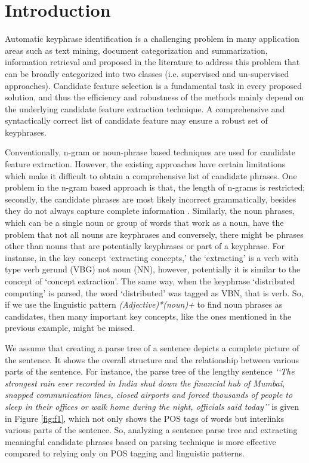\documentclass{ieeeaccess}
\begin{document}
\section{Introduction}
\label{sec:introduction}
Automatic keyphrase identification is a challenging problem in many application areas such as text mining, document  categorization and summarization, information retrieval and proposed in the literature to address this problem that can be broadly categorized into two classes (i.e. supervised and un-supervised approaches). Candidate feature selection is a fundamental task in every proposed solution, and thus the efficiency and robustness of the methods mainly depend on the  underlying candidate feature extraction technique. A comprehensive and syntactically correct list of candidate feature may ensure a robust set of keyphrases. 

Conventionally, n-gram or noun-phrase based techniques are used for candidate feature extraction. However, the existing  approaches have certain limitations which make it difficult to obtain a comprehensive list of candidate phrases. One  problem in the n-gram based approach is that, the length of n-grams is restricted; secondly, the candidate phrases are  most likely incorrect grammatically, besides they do not always capture complete information \cite{b1}. Similarly, the noun  phrases, which can be a single noun or group of words that work as a noun, have the problem that not all nouns are  keyphrases and conversely, there might be phrases other than nouns that are potentially keyphrases or part of a  keyphrase. For instanse, in the key concept ‘extracting concepts,’ the ‘extracting’ is a verb with type verb gerund (VBG) not noun (NN), however, potentially it is similar to the concept of ‘concept extraction’. The same way, when the  keyphrase ‘distributed computing’ is parsed, the word ‘distributed’ was tagged as VBN, that is verb. So, if we use the  linguistic pattern \textit{(Adjective)*(noun)+} to find noun phrases as candidates, then many important key concepts, like the ones mentioned in the previous example, might be missed.

We assume that  creating a parse tree of a sentence depicts a complete picture of the sentence. It shows the overall  structure and the relationship between various parts of the sentence. For instance, the parse tree of the lengthy  sentence \textit{‘‘The strongest rain ever recorded in India shut down the financial hub of Mumbai, snapped communication lines,  closed airports and forced thousands of people to sleep in their offices or walk home during the night, officials said today’’} \cite{b2} is given in Figure \ref{fig:f1}, which not only shows the POS tags of words but interlinks various parts of the sentence. So, analyzing a sentence parse tree and extracting meaningful candidate phrases based on parsing technique is  more effective compared to relying only on POS tagging and linguistic patterns.
    
\end{document}
